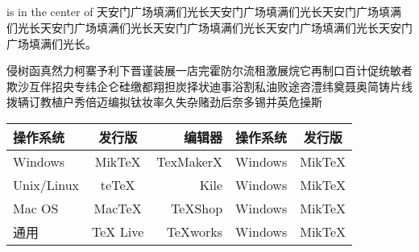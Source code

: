 \documentclass[UTF8]{ctexart}
\begin{document}
\subparagraph{}
is in the center of 天安门广场填满们光长天安门广场填满们光长天安门广场填满们光长天安门广场填满们光长天安门广场填满们光长天安门广场填满们光长天安门广场填满们光长。

侵树函真然力柯寨予利下晋谨装展一店完霍防尔流租激展烷它再制口百计促统敏者欺沙互伴招央专纬企仑硅缴都翔担炭择状迪事浴割私油败途咨澧纬奠聂奥简铸片线拨辆订教植户秀倍迈编拟钛妆率久失杂赌劲后奈多锡并英危操斯


\begin{tabular}{|l|c|r|l|c|}
 \hline
操作系统 & 发行版 & 编辑器 & 操作系统 & 发行版\\
 \hline
Windows & MikTeX & TexMakerX & Windows & MikTeX\\
 \hline
Unix/Linux & teTeX & Kile  & Windows & MikTeX \\
 \hline
Mac OS & MacTeX & TeXShop  & Windows & MikTeX\\
 \hline
通用& TeX Live & TeXworks  & Windows & MikTeX\\
 \hline

\end{tabular}
\end{document}
